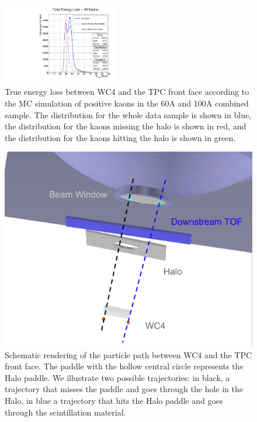 \begin{figure}[hbpt]
\centering
\includegraphics[width=0.45\textwidth]{Chapter-5/Images/ELossKaons.pdf}
\caption{True energy loss between WC4 and the TPC front face according to the MC simulation of positive kaons in the 60A and 100A combined sample. The distribution for the whole data sample is shown in blue, the distribution for the kaons missing the halo is shown in red, and the distribution for the kaons hitting the halo is shown in green.  }
\label{fig:ELossKaons}
\end{figure}




\begin{figure}[hbpt]
\centering
\includegraphics[scale=0.5]{Chapter-5/Images/Halo.png}
\caption{Schematic rendering of the particle path between WC4 and the TPC front face. The paddle with the hollow central circle represents the Halo paddle. We illustrate two possible trajectories: in black, a trajectory that misses the paddle and goes through the hole in the Halo, in blue a trajectory that hits the Halo paddle and goes through the scintillation material.}
\label{fig:Halo}
\end{figure}



